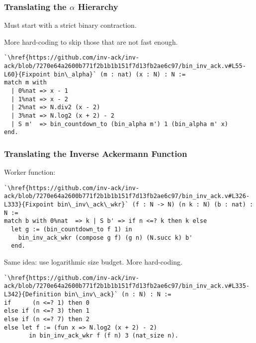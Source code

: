 \begin{frame}[fragile]
\frametitle{Translating the $\alpha$ Hierarchy}

Must start with a strict binary contraction.

\smallskip

More hard-coding to skip those that are not fast enough.

\bigskip

\pause 
\begin{lstlisting}
`\href{https://github.com/inv-ack/inv-ack/blob/7270e64a2600b771f2b1b1b151f7d13fb2ae6c97/bin_inv_ack.v#L55-L60}{Fixpoint bin\_alpha}` (m : nat) (x : N) : N :=
match m with
  | 0%nat => x - 1          
  | 1%nat => x - 2
  | 2%nat => N.div2 (x - 2) 
  | 3%nat => N.log2 (x + 2) - 2
  | S m'  => bin_countdown_to (bin_alpha m') 1 (bin_alpha m' x)
end.
\end{lstlisting}

\end{frame}


\begin{frame}[fragile]
\frametitle{Translating the Inverse Ackermann Function}

Worker function:

\begin{lstlisting}
`\href{https://github.com/inv-ack/inv-ack/blob/7270e64a2600b771f2b1b1b151f7d13fb2ae6c97/bin_inv_ack.v#L326-L333}{Fixpoint bin\_inv\_ack\_wkr}` (f : N -> N) (n k : N) (b : nat) : N :=
match b with 0%nat  => k | S b' => if n <=? k then k else
  let g := (bin_countdown_to f 1) in
    bin_inv_ack_wkr (compose g f) (g n) (N.succ k) b'
  end.
\end{lstlisting}

\pause 
Same idea: use logarithmic size budget. More hard-coding.

\pause 
\begin{lstlisting}
`\href{https://github.com/inv-ack/inv-ack/blob/7270e64a2600b771f2b1b1b151f7d13fb2ae6c97/bin_inv_ack.v#L335-L342}{Definition bin\_inv\_ack}` (n : N) : N :=
if      (n <=? 1) then 0
else if (n <=? 3) then 1
else if (n <=? 7) then 2
else let f := (fun x => N.log2 (x + 2) - 2)
       in bin_inv_ack_wkr f (f n) 3 (nat_size n).
\end{lstlisting}

\end{frame}


